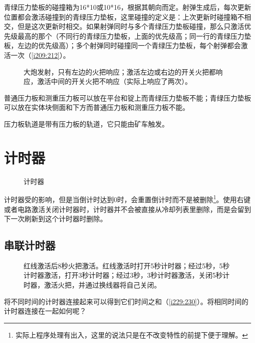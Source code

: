 青绿压力垫板的碰撞箱为16*10或10*16，根据其朝向而定。射弹生成后，每次更新位置都会激活碰撞到的青绿压力垫板，这里碰撞的定义是：上次更新时碰撞箱不相交，但是这次更新时相交。如果射弹同时与多个青绿压力垫板碰撞，那么只激活优先级最高的那个（不同行的青绿压力垫板，上面的优先级高；同一行的青绿压力垫板，左边的优先级高）；多个射弹同时碰撞同一个青绿压力垫板，每个射弹都会激活一次（\autoref{i209:212}）。

\begin{figure}[!ht]
  \centering
  \qquad
  \caption{\protect{}大炮发射，只有左边的火把响应；\protect{}激活左边或右边的开关火把都响应，激活中间的开关火把不响应（实际上响应了两次）。}
  \label{i209:212}
\end{figure}

普通压力板和测重压力板可以放在平台和锭上而青绿压力垫板不能；青绿压力垫板可以放在实体块侧面和下方而普通压力板和测重压力板不能。

压力板轨道是带有压力板的轨道，它只能由矿车触发。

\section{计时器}\label{sec:timer}
\begin{figure}[!ht]
  \centering
  \quad
  \quad
  \quad
  \quad
  \caption{计时器}
\end{figure}

计时器受的影响，但是当倒计时达到0时，会重置倒计时而不是被删除\footnote{实际上程序处理有出入，这里的说法只是在不改变特性的前提下便于理解。}。使用右键或者电路激活关闭计时器时，计时器并不会被直接从冷却列表里删除，而是会留到下一次刷新到这个计时器时删除。

\subsection{串联计时器}\label{sec20}
\begin{figure}[!ht]
  \centering
  \qquad
  \caption{红线激活后8秒火把激活。红线激活时打开5秒计时器；经过5秒，5秒计时器激活，打开3秒计时器；经过3秒，3秒计时器激活，关闭5秒计时器，激活火把，并通过换线器将自己关闭。}
  \label{i229:230}
\end{figure}
将不同时间的计时器连接起来可以得到它们时间之和（\autoref{i229:230}）。将相同时间的计时器连接在一起如何呢？

